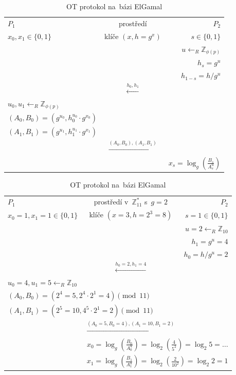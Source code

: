\begin{table}[ht]
    \centering
    \begin{tabular}{lcr}
    $P_1$ & prostředí & $P_2$ \\
    $x_0, x_1 \in \{0,1\}$ & klíče $(x, h = g^x)$ & $s \in \{0,1\}$ \\
    \hline
    & & $u \leftarrow_R \mathbb{Z}_{\phi(p)}$ \\
    & & $h_s = g^u$ \\
    & & $h_{1-s} = h / g^u$ \\
    & $\stackrel{h_0, h_1}{\longleftarrow}$ & \\
    $u_0, u_1 \leftarrow_R \mathbb{Z}_{\phi(p)}$ & & \\
    $(A_0, B_0) = (g^{u_0}, h_0^{u_0} \cdot g^{x_0})$ & & \\
    $(A_1, B_1) = (g^{u_1}, h_1^{u_1} \cdot g^{x_1})$ & & \\
    & $\stackrel{(A_0, B_0), (A_1, B_1)}{\longrightarrow}$ & \\
    & & $x_s = \log_g \left( \frac{B_s}{A_s^u} \right)$
    \end{tabular}

    \vspace*{3em}

    \begin{tabular}{lcr}
    $P_1$ & prostředí v~$\mathbb{Z}_{11}^*$ s~$g=2$ & $P_2$ \\
    $x_0 = 1, x_1 = 1 \in \{0,1\}$ & klíče $(x = 3, h = 2^3 = 8)$ & $s = 1\in \{0,1\}$ \\
    \hline
    & & $u = 2 \leftarrow_R \mathbb{Z}_{10}$ \\
    & & $h_1 = g^u = 4$ \\
    & & $h_0 = h / g^u = 2$ \\
    & $\stackrel{h_0 = 2, h_1 = 4}{\longleftarrow}$ & \\
    $u_0 = 4, u_1 = 5 \leftarrow_R \mathbb{Z}_{10}$ & & \\
    \multicolumn{2}{l}{$(A_0, B_0) = (2^{4} = 5, 2^{4} \cdot 2^{1} = 4) \pmod {11}$} & \\
    \multicolumn{2}{l}{$(A_1, B_1) = (2^{5} = 10, 4^{5} \cdot 2^{1} = 2) \pmod {11}$} & \\
    & $\stackrel{(A_0 = 5, B_0 = 4), (A_1 = 10, B_1 = 2)}{\longrightarrow}$ & \\
    & \multicolumn{2}{r}{$x_0 = \log_g \left( \frac{B_0}{A_0^u} \right) = \log_2 \left( \frac{4}{5^2} \right) = \log_2 5 = \dots$} \\
    & \multicolumn{2}{r}{$x_1 = \log_g \left( \frac{B_1}{A_1^u} \right) = \log_2 \left( \frac{2}{10^2} \right) = \log_2 2 = 1$} \\
    \end{tabular}
    \caption*{OT protokol na~bázi ElGamal}
    \label{fig:ot-elgamal}
\end{table}
\FloatBarrier


